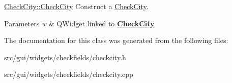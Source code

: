 \hyperlink{classCheckCity_a639556875bd01b8cee5cf92759972ca5}{Check\+City\+::\+Check\+City} Construct a \hyperlink{classCheckCity}{Check\+City}. 


\begin{DoxyParams}{Parameters}
{\em w} & Q\+Widget linked to {\bfseries \hyperlink{classCheckCity}{Check\+City}} \\
\hline
\end{DoxyParams}


The documentation for this class was generated from the following files\+:\begin{DoxyCompactItemize}
\item 
src/gui/widgets/checkfields/checkcity.\+h\item 
src/gui/widgets/checkfields/checkcity.\+cpp\end{DoxyCompactItemize}
